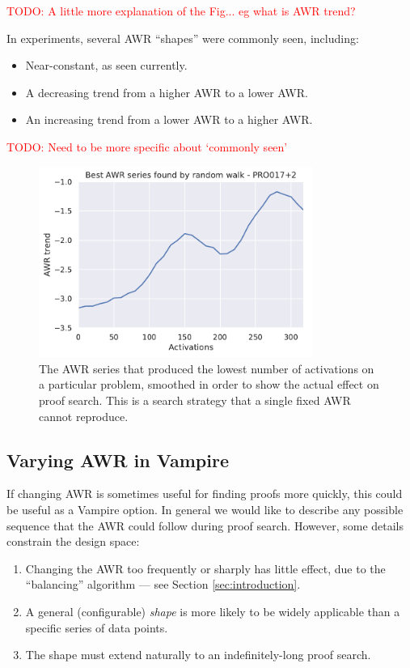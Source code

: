 \documentclass{llncs}
\newcommand{\todo}[1]{\textcolor{red}{TODO: #1}}
\begin{document}
\todo{A little more explanation of the Fig... eg what is AWR trend?}

In experiments, several AWR ``shapes'' were commonly seen, including:
\begin{itemize}
	\item Near-constant, as seen currently.
	\item A decreasing trend from a higher AWR to a lower AWR.
	\item An increasing trend from a lower AWR to a higher AWR.
\end{itemize}
\todo{Need to be more specific about `commonly seen'}

\begin{figure}
	\centering
	\includegraphics[width=0.8\textwidth]{random-walk}
	\caption{The AWR series that produced the lowest number of activations on a particular problem, smoothed in order to show the actual effect on proof search. This is a search strategy that a single fixed AWR cannot reproduce.}
	\label{fig:random-walk}
\end{figure}

\subsection{Varying AWR in Vampire} \label{sec:varying:implementation}

If changing AWR is sometimes useful for finding proofs more quickly, this could be useful as a Vampire option.
In general we would like to describe any possible sequence that the AWR could follow during proof search.
However, some details constrain the design space:
\begin{enumerate}
	\item Changing the AWR too frequently or sharply has little effect, due to the ``balancing'' algorithm --- see Section \ref{sec:introduction}.
	\item A general (configurable) \emph{shape} is more likely to be widely applicable than a specific series of data points.
	\item The shape must extend naturally to an indefinitely-long proof search.
\end{enumerate}
\end{document}
